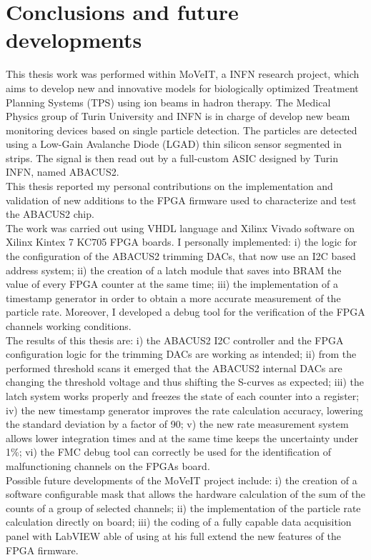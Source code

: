 \chapter*{Conclusions and future developments}
\noindent This thesis work was performed within MoVeIT,
a INFN research project, which aims to develop new and
innovative models for biologically optimized Treatment
Planning Systems (TPS) using ion beams in hadron therapy.
The Medical Physics group of Turin University and INFN
is in charge of develop new beam monitoring devices
based on single particle detection.
The particles are detected using a Low-Gain Avalanche Diode
(LGAD) thin silicon sensor segmented in strips. The signal
is then read out by a full-custom ASIC designed by Turin
INFN, named ABACUS2.\\
\noindent This thesis reported my personal contributions on the
implementation and validation of new additions to the
FPGA firmware used to characterize and test the ABACUS2
chip.\\
\noindent The work was carried out using VHDL language and
Xilinx Vivado software on Xilinx Kintex 7 KC705 FPGA boards. 
I personally implemented:
i) the logic for the configuration of the ABACUS2 trimming
DACs, that now use an I2C based address system;
ii) the creation of a latch module that saves into BRAM the
value of every FPGA counter at the same time;
iii) the implementation of a timestamp generator in order
to obtain a more accurate measurement of the particle rate.
Moreover, I developed a debug tool for the verification
of the FPGA channels working conditions.\\
\noindent The results of this thesis are:
i) the ABACUS2 I2C controller and the FPGA configuration
logic for the trimming DACs are working as intended; 
ii) from the performed threshold scans it emerged that the ABACUS2
internal DACs are changing the threshold voltage and thus
shifting the S-curves as expected;
iii) the latch system works properly and freezes the state
of each counter into a register;
iv) the new timestamp generator improves the rate
calculation accuracy, lowering the standard deviation by a factor of 90; 
v) the new rate measurement system allows lower integration times
and at the same time keeps the uncertainty under 1\%;
vi) the FMC debug tool can correctly be used for the identification
of malfunctioning channels on the FPGAs board.\\
\noindent Possible future developments of the MoVeIT project
include:
i) the creation of a software configurable mask that allows
the hardware calculation of the sum of the counts of
a group of selected channels;
ii) the implementation of the particle rate calculation directly
on board;
iii) the coding of a fully capable data acquisition panel with
LabVIEW able of using at his full extend the new features of the
FPGA firmware.



